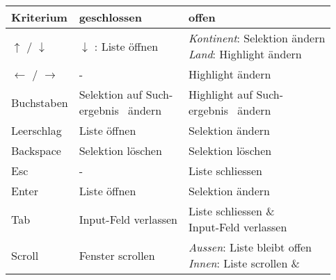 \begin{table}[!htb]
    \label{table:interactionCountryInput}
    \footnotesize
    \begin{adjustbox}{max width=0.95\textwidth}
        \begin{threeparttable}
            \begin{tabular}{ l || l | l }
                \bf{Kriterium}    & \bf{geschlossen} & \bf{offen} \\
                \hline \hline
                $\uparrow$ / $\downarrow$    & $\downarrow$ : Liste öffnen & \tbbr{\emph{Kontinent}: Selektion ändern \\ 
                                                                                   \emph{Land}: Highlight ändern}  \\
                \hline
                $\leftarrow$ / $\rightarrow$ & -                           & Highlight ändern                         \\
                \hline
                Buchstaben & \tbbr{Selektion auf Such-\\ 
                                   ergebnis\tnote{1} \ ändern}             & \tbbr{Highlight auf Such-\\ 
                                                                                   ergebnis\tnote{1} \ ändern}        \\
                \hline
                Leerschlag & Liste öffnen          & Selektion ändern  \\
                \hline
                Backspace  & Selektion löschen     & Selektion löschen \\
                \hline
                Esc        & -                     & Liste schliessen  \\
                \hline \hline
                Enter      & Liste öffnen          & Selektion ändern  \\
                \hline
                Tab        & Input-Feld verlassen  & \tbbr{Liste schliessen \& \\ 
                                                           Input-Feld verlassen }                 \\
                \hline \hline
                Scroll     & Fenster scrollen      & \tbbr{\emph{Aussen}: Liste bleibt offen \\
                                                           \emph{Innen}: Liste scrollen \& \\ 
}
\end{tabular}
\end{threeparttable}
\end{adjustbox}
\end{table}
